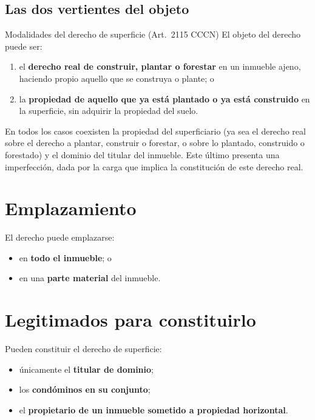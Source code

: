 \documentclass[12pt,oneside]{book}
\begin{document}
\subsection{Las dos vertientes del objeto}

\begin{definition}{Modalidades del derecho de superficie (Art.~2115 CCCN)}
El objeto del derecho puede ser:
\begin{enumerate}[label=(\alph*)]
    \item el \textbf{derecho real de construir, plantar o forestar} en un inmueble ajeno, haciendo propio aquello que se construya o plante; o
    \item la \textbf{propiedad de aquello que ya está plantado o ya está construido} en la superficie, sin adquirir la propiedad del suelo.
\end{enumerate}
\end{definition}

En todos los casos coexisten la propiedad del superficiario (ya sea el derecho real sobre el derecho a plantar, construir o forestar, o sobre lo plantado, construido o forestado) y el dominio del titular del inmueble. Este último presenta una imperfección, dada por la carga que implica la constitución de este derecho real.

\section{Emplazamiento}

El derecho puede emplazarse:

\begin{itemize}
    \item en \textbf{todo el inmueble}; o
    \item en una \textbf{parte material} del inmueble.
\end{itemize}

\section{Legitimados para constituirlo}

Pueden constituir el derecho de superficie:

\begin{itemize}
    \item únicamente el \textbf{titular de dominio};
    \item los \textbf{condóminos en su conjunto};
    \item el \textbf{propietario de un inmueble sometido a propiedad horizontal}.
\end{itemize}
\end{document}
